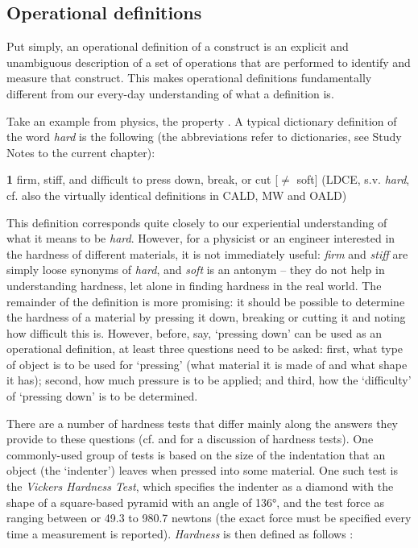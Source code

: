 \subsection{Operational definitions}
\label{sec:operationaldefinitions}

Put simply, an operational definition of a construct is an explicit and unambiguous description of a set of operations that are performed to identify and measure that construct. This makes operational definitions fundamentally different from our every-day understanding of what a definition is.

Take an example from physics, the property . A typical dictionary definition of the word \textit{hard} is the following (the abbreviations refer to dictionaries, see Study Notes to the current chapter):

\begin{exe}
\ex \textbf{1}  firm, stiff, and difficult to press down, break, or cut [$\neq$ soft] (LDCE, s.v. \textit{hard}, cf. also the virtually identical definitions in CALD, MW and OALD)
\label{ex:label}
\end{exe}

This definition corresponds quite closely to our experiential understanding of what it means to be \textit{hard}. However, for a physicist or an engineer interested in the hardness of different materials, it is not immediately useful: \textit{firm} and \textit{stiff} are simply loose synonyms of \textit{hard}, and \textit{soft} is an antonym -- they do not help in understanding hardness, let alone in finding hardness in the real world. The remainder of the definition is more promising: it should be possible to determine the hardness of a material by pressing it down, breaking or cutting it and noting how difficult this is. However, before, say, `pressing down' can be used as an operational definition, at least three questions need to be asked: first, what type of object is to be used for `pressing' (what material it is made of and what shape it has); second, how much pressure is to be applied; and third, how the `difficulty' of `pressing down' is to be determined.

There are a number of hardness tests that differ mainly along the answers they provide to these questions (cf. \citet{herrmann_hardness_2011} and \citet{czichos_mechanical_2011} for a discussion of hardness tests). One commonly-used group of tests is based on the size of the indentation that an object (the `indenter') leaves when pressed into some material. One such test is the \emph{Vickers Hardness Test}, which specifies the indenter as a diamond with the shape of a square-based pyramid with an angle of 136°, and the test force as ranging between or 49.3 to 980.7 newtons (the exact force must be specified every time a measurement is reported). \textit{Hardness} is then defined as follows \citep[cf.][43]{herrmann_hardness_2011}:

